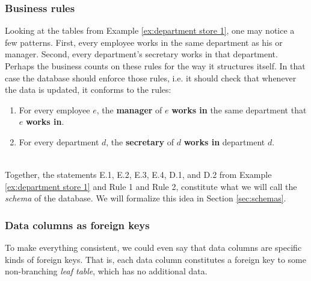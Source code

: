 
\subsubsection{Business rules}

Looking at the tables from Example \ref{ex:department store 1}, one may notice a few patterns. First, every employee works in the same department as his or manager. Second, every department's secretary works in that department. Perhaps the business counts on these rules for the way it structures itself. In that case the database should enforce those rules, i.e. it should check that whenever the data is updated, it conforms to the rules: 

\begin{enumerate}
\item For every employee $e$, the {\bf manager} of $e$ {\bf works in} the same department that $e$ {\bf works in}.
\item For every department $d$, the {\bf secretary} of $d$ {\bf works in} department $d$.
\end{enumerate}
\vspace{-.3in}\begin{align}\label{dia:rules}\end{align}\vspace{-.3in}

Together, the statements E.1, E.2, E.3, E.4, D.1, and D.2 from Example \ref{ex:department store 1} and Rule 1 and Rule 2, constitute what we will call the {\em schema} of the database. We will formalize this idea in Section \ref{sec:schemas}.


\subsubsection{Data columns as foreign keys}

To make everything consistent, we could even say that data columns are specific kinds of foreign keys. That is, each data column constitutes a foreign key to some non-branching {\em leaf table}, which has no additional data. 

